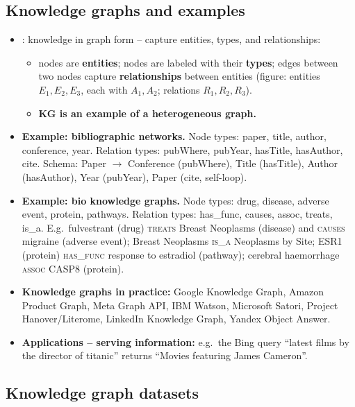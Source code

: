\subsection{Knowledge graphs and examples}\label{sec:lec10-kgdef}

\begin{itemize}
  \item {}: knowledge in graph form -- capture
    entities, types, and relationships:
    \begin{itemize}
      \item nodes are \textbf{entities}; nodes are labeled with their
        \textbf{types}; edges between two nodes capture \textbf{relationships}
        between entities (figure: entities $E_1,E_2,E_3$, each with $A_1,A_2$;
        relations $R_1,R_2,R_3$).
      \item \textbf{KG is an example of a heterogeneous graph.}
    \end{itemize}
  \item \textbf{Example: bibliographic networks.} Node types: paper, title,
    author, conference, year. Relation types: pubWhere, pubYear, hasTitle,
    hasAuthor, cite. Schema: Paper $\to$ Conference (pubWhere), Title
    (hasTitle), Author (hasAuthor), Year (pubYear), Paper (cite, self-loop).
  \item \textbf{Example: bio knowledge graphs.} Node types: drug, disease, adverse
    event, protein, pathways. Relation types: has\_func, causes, assoc, treats,
    is\_a. E.g.\ fulvestrant (drug) \textsc{treats} Breast Neoplasms (disease)
    and \textsc{causes} migraine (adverse event); Breast Neoplasms \textsc{is\_a}
    Neoplasms by Site; ESR1 (protein) \textsc{has\_func} response to estradiol
    (pathway); cerebral haemorrhage \textsc{assoc} CASP8 (protein).
  \item \textbf{Knowledge graphs in practice:} Google Knowledge Graph, Amazon
    Product Graph, Meta Graph API, IBM Watson, Microsoft Satori, Project
    Hanover/Literome, LinkedIn Knowledge Graph, Yandex Object Answer.
  \item \textbf{Applications -- serving information:} e.g.\ the Bing query
    ``latest films by the director of titanic'' returns ``Movies featuring James
    Cameron''.
\end{itemize}

\subsection{Knowledge graph datasets}\label{sec:lec10-datasets}

